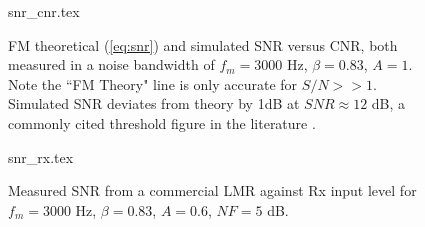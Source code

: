\documentclass{article}
\begin{document}
\begin{figure}[h]
\caption{FM theoretical (\ref{eq:snr}) and simulated SNR versus CNR, both measured in a noise bandwidth of $f_m=3000$ Hz, $\beta=0.83$, $A=1$. Note the ``FM Theory" line is only accurate for $S/N>>1$. Simulated SNR deviates from theory by 1dB at $SNR \approx 12$ dB, a commonly cited threshold figure in the literature \cite{crilly2009communication}.}
\label{fig:snr_cnr}
\begin{center}
 {snr_cnr.tex}
\end{center}
\end{figure}

\begin{figure}[h]
\caption{Measured SNR from a commercial LMR against Rx input level for $f_m=3000$ Hz, $\beta=0.83$, $A=0.6$, $NF=5$ dB.}
\label{fig:snr_rx}
\begin{center}
 {snr_rx.tex}
\end{center}
\end{figure}



\end{document}
